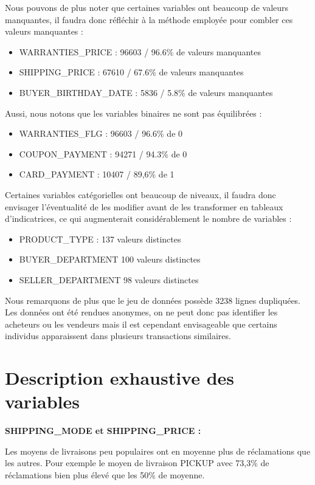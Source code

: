Nous pouvons de plus noter que certaines variables ont beaucoup de valeurs manquantes, il 
faudra donc réfléchir à la méthode employée pour combler ces valeurs manquantes :

\begin{itemize}
\item WARRANTIES_PRICE : 96603 / 96.6\% de valeurs manquantes
\item SHIPPING_PRICE : 67610 / 67.6\% de valeurs manquantes
\item BUYER_BIRTHDAY_DATE : 5836 / 5.8\% de valeurs manquantes
\end{itemize}

Aussi, nous notons que les variables binaires ne sont pas équilibrées :

\begin{itemize}
\item WARRANTIES_FLG : 96603 / 96.6\% de 0
\item COUPON_PAYMENT : 94271 / 94.3\% de 0
\item CARD_PAYMENT : 10407 / 89,6\% de 1
\end{itemize}

Certaines variables catégorielles ont beaucoup de niveaux, il faudra donc envisager 
l'éventualité de les modifier avant de les transformer en tableaux d'indicatrices, ce qui
augmenterait considérablement le nombre de variables :

\begin{itemize}
\item PRODUCT_TYPE : 137 valeurs distinctes
\item BUYER_DEPARTMENT 100 valeurs distinctes
\item SELLER_DEPARTMENT 98 valeurs distinctes
\end{itemize}

Nous remarquons de plus que le jeu de données possède 3238 lignes dupliquées. Les
données ont été rendues anonymes, on ne peut donc pas identifier les acheteurs ou les
vendeurs mais il est cependant envisageable que certains individus apparaissent dans 
plusieurs transactions similaires.

\section{Description exhaustive des variables}

\textbf{SHIPPING_MODE et SHIPPING_PRICE :}

Les moyens de livraisons peu populaires ont en moyenne plus de réclamations que les autres.
Pour exemple le moyen de livraison PICKUP avec 73,3\% de réclamations bien plus élevé que 
les 50\% de moyenne.

